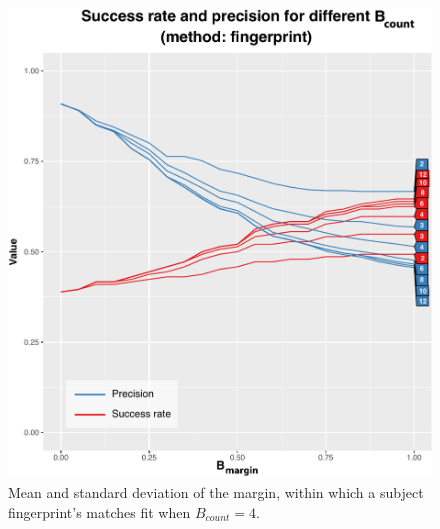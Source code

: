 \documentclass[thesis.tex]{subfiles}
\begin{document}
\begin{figure}[t]
\centering \includegraphics[page=3,width=\textwidth,height=\textheight,keepaspectratio=true]{images/experiment/match_precision}
\caption{Mean and standard deviation of the margin, within which a subject fingerprint's matches fit when $B_{count}=4$.}
\label{figure:match_precision_margin}
\end{figure}
\end{document}
